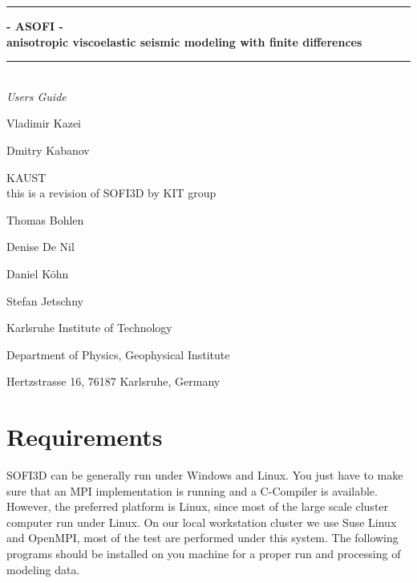 \documentclass[11pt,onecolumn,oneside]{article}
\begin{document}
\thispagestyle{empty}
\newcommand{\Rule}{\rule{\textwidth}{1mm}}
\newtheorem{theorem}{Hypothese}[section]
\begin{center}
\Rule \vspace{5mm}
\sffamily \bfseries \Huge
- ASOFI - 
\\ 
anisotropic viscoelastic seismic modeling with finite differences 
\\
\vspace{1mm}\Rule\\
\vspace{1 cm}
\Large\emph{Users Guide} \par
\large Vladimir Kazei \par
\large Dmitry Kabanov \par
\Large KAUST
\\
\vspace{3cm}
this is a revision of SOFI3D by KIT group
\vspace{2 cm}

\large Thomas Bohlen \par
\large Denise De Nil \par
\large Daniel K\"ohn \par
\large Stefan Jetschny\par
\vspace{2 cm}

\small Karlsruhe Institute of Technology\par
\small Department of Physics, Geophysical Institute \par
\small Hertzstrasse 16, 76187 Karlsruhe, Germany \par
\end{center}

\tableofcontents
\newpage
\section{Requirements}
\label{requirements}

SOFI3D can be generally run under Windows and Linux. You just have to make sure that an MPI implementation is running and a C-Compiler is available. However, the preferred platform is Linux, since most of the large scale cluster computer run under Linux. On our local workstation cluster we use Suse Linux and OpenMPI, most of the test are performed under this system. The following programs should be installed on you machine for a proper run and processing of modeling data. 
\end{document}

